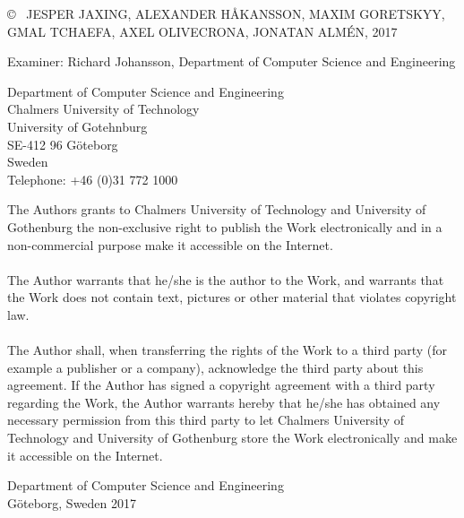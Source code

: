 \copyright ~ JESPER JAXING, ALEXANDER HÅKANSSON, MAXIM GORETSKYY, GMAL TCHAEFA, AXEL OLIVECRONA, JONATAN ALMÉN, 2017\\ \setlength{\parskip}{0.5cm}

Examiner: Richard Johansson, Department of Computer Science and Engineering \setlength{\parskip}{1cm}

Department of Computer Science and Engineering\\
Chalmers University of Technology\\
University of Gotehnburg\\
SE-412 96 Göteborg\\
Sweden\\
Telephone: +46 (0)31 772 1000 \setlength{\parskip}{0.5cm}

\vfill
The Authors grants to Chalmers University of Technology and University of Gothenburg the non-exclusive right to publish the Work electronically and in a non-commercial purpose make it accessible on the Internet.\\\\
The Author warrants that he/she is the author to the Work, and warrants that the Work does not contain text, pictures or other material that violates copyright law.\\\\
The Author shall, when transferring the rights of the Work to a third party (for example a publisher or a company), acknowledge the third party about this agreement. If the Author has signed a copyright agreement with a third party regarding the Work, the Author warrants hereby that he/she has obtained any necessary permission from this third party to let Chalmers University of Technology and University of Gothenburg  store the Work electronically and make it accessible on the Internet.


\vfill
 \setlength{\parskip}{0.5cm}

Department of Computer Science and Engineering\\
Göteborg, Sweden 2017

